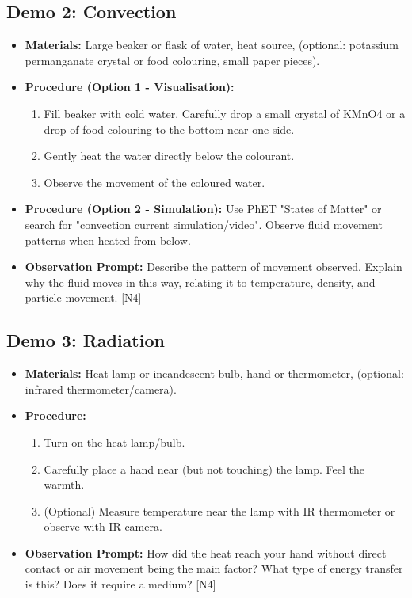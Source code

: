 \documentclass[11pt, a4paper]{article} %
\begin{document}
\subsection*{Demo 2: Convection}
\begin{itemize}
    \item \textbf{Materials:} Large beaker or flask of water, heat source, (optional: potassium permanganate crystal or food colouring, small paper pieces).
    \item \textbf{Procedure (Option 1 - Visualisation):}
        \begin{enumerate}
        \item Fill beaker with cold water. Carefully drop a small crystal of KMnO4 or a drop of food colouring to the bottom near one side.
        \item Gently heat the water directly below the colourant.
        \item Observe the movement of the coloured water.
        \end{enumerate}
    \item \textbf{Procedure (Option 2 - Simulation):} Use PhET "States of Matter" or search for "convection current simulation/video". Observe fluid movement patterns when heated from below.
    \item \textbf{Observation Prompt:} Describe the pattern of movement observed. Explain why the fluid moves in this way, relating it to temperature, density, and particle movement. [N4]
\end{itemize}

\subsection*{Demo 3: Radiation}
\begin{itemize}
    \item \textbf{Materials:} Heat lamp or incandescent bulb, hand or thermometer, (optional: infrared thermometer/camera).
    \item \textbf{Procedure:}
        \begin{enumerate}
        \item Turn on the heat lamp/bulb.
        \item Carefully place a hand near (but not touching) the lamp. Feel the warmth.
        \item (Optional) Measure temperature near the lamp with IR thermometer or observe with IR camera.
        \end{enumerate}
    \item \textbf{Observation Prompt:} How did the heat reach your hand without direct contact or air movement being the main factor? What type of energy transfer is this? Does it require a medium? [N4]
\end{itemize}
\end{document}
